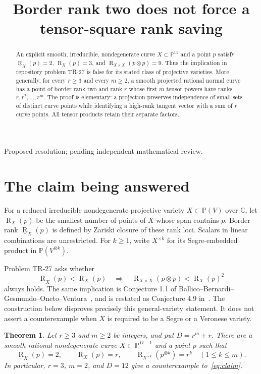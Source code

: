 \documentclass[11pt]{article}
\title{Border rank two does not force a tensor-square rank saving}
\author{}
\date{}
\newtheorem{theorem}{Theorem}
\theoremstyle{remark}\newtheorem{remark}[theorem]{Remark}
\newcommand{\C}{\mathbb C}
\newcommand{\PP}{\mathbb P}
\newcommand{\rk}{\operatorname{R}}
\newcommand{\brk}{\underline{\operatorname{R}}}
\begin{document}
\maketitle
\vspace{-2.5em}
\begin{center}\small Proposed resolution; pending independent mathematical review.\end{center}
\begin{abstract}
An explicit smooth, irreducible, nondegenerate curve $X\subset\PP^{11}$ and a point $p$ satisfy
$\brk_X(p)=2$, $\rk_X(p)=3$, and $\rk_{X\times X}(p\otimes p)=9$.
Thus the implication in repository problem TR-27 is false for its stated class of projective varieties.
More generally, for every $r\geq3$ and every $m\geq2$, a smooth projected rational normal curve has a point of border rank two and rank $r$ whose first $m$ tensor powers have ranks $r,r^2,\ldots,r^m$.
The proof is elementary: a projection preserves independence of small sets of distinct curve points while identifying a high-rank tangent vector with a sum of $r$ curve points.
All tensor products retain their separate factors.
\end{abstract}

\section{The claim being answered}
For a reduced irreducible nondegenerate projective variety $X\subset\PP(V)$ over $\C$, let $\rk_X(p)$ be the smallest number of points of $X$ whose span contains $p$. Border rank $\brk_X(p)$ is defined by Zariski closure of these rank loci. Scalars in linear combinations are unrestricted. For $k\geq1$, write $X^{\times k}$ for its Segre-embedded product in $\PP(V^{\otimes k})$.

Problem TR-27 asks whether
\begin{equation}\label{eq:claim}
 \brk_X(p)<\rk_X(p)\quad\Longrightarrow\quad
 \rk_{X\times X}(p\otimes p)<\rk_X(p)^2
\end{equation}
always holds. The same implication is Conjecture 1.1 of Ballico--Bernardi--Gesmundo--Oneto--Ventura~\cite{BBGOV}, and is restated as Conjecture 4.9 in~\cite{OV}. The construction below disproves precisely this general-variety statement. It does not assert a counterexample when $X$ is required to be a Segre or a Veronese variety.

\begin{theorem}\label{thm:main}
Let $r\geq3$ and $m\geq2$ be integers, and put $D=r^m+r$. There are a smooth rational nondegenerate curve $X\subset\PP^{D-1}$ and a point $p$ such that
\[
 \brk_X(p)=2,\qquad \rk_X(p)=r,\qquad
 \rk_{X^{\times k}}(p^{\otimes k})=r^k\quad(1\leq k\leq m).
\]
In particular, $r=3$, $m=2$, and $D=12$ give a counterexample to~\eqref{eq:claim}.
\end{theorem}
\end{document}
